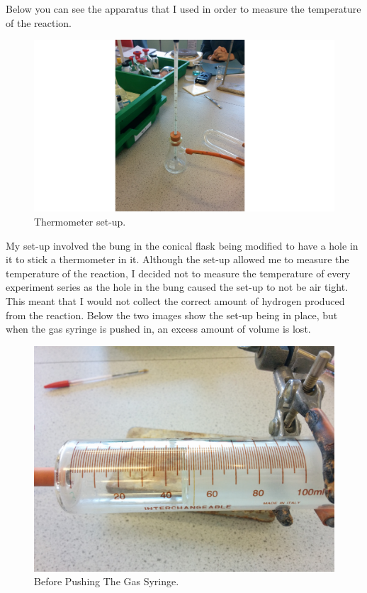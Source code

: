 Below you can see the apparatus that I used in order to measure the temperature of the reaction.

\begin{figure}[H]
    \includegraphics[width=\textwidth]{./preliminarywork/images/ThermometerSetUp.pdf}
    \caption{Thermometer set-up.} \label{fig:Thermometer Set-Up}
\end{figure}

My set-up involved the bung in the conical flask being modified to have a hole in it to stick a thermometer in it. Although the set-up allowed me to measure the temperature of the reaction, I decided not to measure the temperature of every experiment series as the hole in the bung caused the set-up to not be air tight. This meant that I would not collect the correct amount of hydrogen produced from the reaction. Below the two images show the set-up being in place, but when the gas syringe is pushed in, an excess amount of volume is lost.

\begin{figure}[H]
    \includegraphics[width=\textwidth]{./preliminarywork/images/BeforePush.jpg}
    \caption{Before Pushing The Gas Syringe.} \label{fig:BeforePush}
\end{figure}

